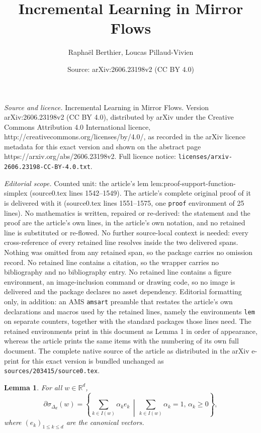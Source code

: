 \documentclass[10pt,a4paper]{amsart}
\title{Incremental Learning in Mirror Flows}
\author{Rapha\"el Berthier, Loucas Pillaud-Vivien}
\date{Source: arXiv:2606.23198v2 (CC BY 4.0)}
\newtheorem{lem}{Lemma}
\newcommand{\R}{\mathbb{R}}
\renewcommand{\geq}{\geqslant}
\renewcommand{\leq}{\leqslant}
\begin{document}
\maketitle

\noindent\emph{Source and licence.} Incremental Learning in Mirror Flows. Version arXiv:2606.23198v2 (CC BY 4.0), distributed by arXiv under the Creative Commons Attribution 4.0 International licence, http://creativecommons.org/licenses/by/4.0/, as recorded in the arXiv licence metadata for this exact version and shown on the abstract page https://arxiv.org/abs/2606.23198v2. Full licence notice: \texttt{licenses/arxiv-2606.23198-CC-BY-4.0.txt}.\par\smallskip

\noindent\textit{Editorial scope.} Counted unit: the article's lem lem:proof-support-function-simplex (source0.tex lines 1542--1549). The article's complete original proof of it is delivered with it (source0.tex lines 1551--1575, one \texttt{proof} environment of 25 lines). No mathematics is written, repaired or re-derived: the statement and the proof are the article's own lines, in the article's own notation, and no retained line is substituted or re-flowed.  No further source-local context is needed: every cross-reference of every retained line resolves inside the two delivered spans.  Nothing was omitted from any retained span, so the package carries no omission record.  No retained line contains a citation, so the wrapper carries no bibliography and no bibliography entry.  No retained line contains a figure environment, an image-inclusion command or drawing code, so no image is delivered and the package declares no asset dependency.  Editorial formatting only, in addition: an AMS \texttt{amsart} preamble that restates the article's own declarations and macros used by the retained lines, namely the environments \texttt{lem} on separate counters, together with the standard packages those lines need.  The retained environments print in this document as Lemma 1 in order of appearance, whereas the article prints the same items with the numbering of its own full document.  The complete native source of the article as distributed in the arXiv e-print for this exact version is bundled unchanged as \texttt{sources/203415/source0.tex}.
\begin{lem}
	\label{lem:proof-support-function-simplex}
	For all $w \in \R^d$, 
	\begin{equation*}
		\partial \sigma_{\Delta_d}(w) = \left\{ \sum_{k \in I(w)} \alpha_k e_k \,\middle|\, \sum_{k \in I(w)} \alpha_k = 1,\, \alpha_k \geq 0 \right\} ,
	\end{equation*}
	where $(e_k)_{1 \leq k \leq d}$ are the canonical vectors.
\end{lem}
\end{document}
